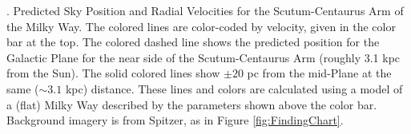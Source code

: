 \textbf{\label{fig:coloredlines}}. Predicted Sky Position and Radial Velocities for the Scutum-Centaurus Arm of the Milky Way.  The colored lines are color-coded by velocity, given in the color bar at the top.  The colored dashed line shows the predicted position for the Galactic Plane for the near side of the Scutum-Centaurus Arm (roughly 3.1 kpc from the Sun).  The solid colored lines show $\pm 20$ pc from the mid-Plane at the same ($\sim3.1$ kpc) distance.   These lines and colors are calculated using a model of a (flat) Milky Way described by the parameters shown above the color bar. Background imagery is from Spitzer, as in Figure \ref{fig:FindingChart}.